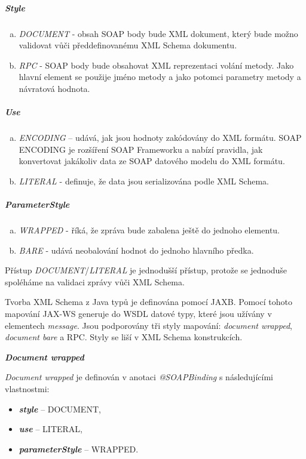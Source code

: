 \documentclass[11pt,twoside,a4paper]{book}
\begin{document}
\subparagraph{Style}
  	\begin{enumerate}[(a)]
  	  \item \textit{DOCUMENT} - obsah SOAP body bude XML dokument, který
  	  bude možno validovat vůči předdefinovanému XML Schema dokumentu.
  	  \item \textit{RPC} - SOAP body bude obsahovat XML reprezentaci volání
  	  metody.
Jako hlavní element se použije jméno metody a jako potomci parametry metody a
návratová hodnota.
	\end{enumerate}
\subparagraph{Use}
	\begin{enumerate}[(a)]
	  \item \textit{ENCODING} – udává, jak jsou hodnoty zakódovány do XML
	  formátu.
SOAP ENCODING je rozšíření SOAP Frameworku a nabízí pravidla, jak
konvertovat jakákoliv data ze SOAP datového modelu do XML formátu.
	  \item \textit{LITERAL} - definuje, že data jsou serializována podle
	  XML Schema.
	\end{enumerate}
\subparagraph{ParameterStyle}
	\begin{enumerate}[(a)]
	  \item \textit{WRAPPED} - říká, že zpráva bude zabalena ještě do
	  jednoho elementu.
	  \item \textit{BARE} - udává neobalování hodnot do jednoho hlavního
	  předka.
	\end{enumerate}

Přístup {\em DOCUMENT}/{\em LITERAL} je jednodušší přístup, protože se jednoduše
spoléháme na validaci zprávy vůči XML Schema.

Tvorba XML Schema z Java typů je definována pomocí JAXB. Pomocí tohoto mapování
JAX-WS generuje do WSDL datové typy, které jsou užívány v elementech {\em
message}. Jsou podporovány tři styly mapování: {\em document wrapped}, {\em
document bare} a RPC. Styly se liší v XML Schema konstrukcích.

\textbf{\textit{Document wrapped}}

{\em Document wrapped} je definován v anotaci {\em @SOAPBinding} s následujícími
vlastnostmi:

\begin{itemize}
  \item \textbf{\textit{style}} – DOCUMENT,
  \item \textbf{\textit{use}} – LITERAL,
  \item \textbf{\textit{parameterStyle}} – WRAPPED.
\end{itemize}
\end{document}
